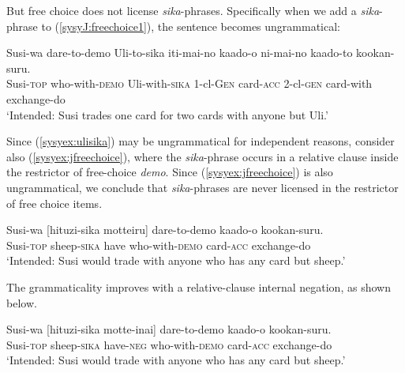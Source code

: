 \documentclass[output=paper,colorlinks,citecolor=brown,
]{langscibook}
\def\refp#1{(\ref{sy#1})}
\def\M#1{\textsc{#1}}
\begin{document}
But free choice does not license \emph{sika}-phrases. Specifically when we add a \emph{sika}-phrase to \refp{syJ:freechoice1}, the sentence becomes ungrammatical:

\ea \label{syex:ulisika}
\gll *Susi-wa dare-to-demo Uli-to-sika iti-mai-no kaado-o ni-mai-no kaado-to kookan-suru.\\
Susi-\M{top} who-with-\M{demo} Uli-with-\M{sika} 1-cl-\M{Gen} card-\M{acc} 2-cl-\M{gen} card-with exchange-do\\
\glt `Intended: Susi trades one card for two cards with anyone but Uli.'\z

Since \refp{syex:ulisika} may be ungrammatical for independent  reasons, consider also \refp{syex:jfreechoice}, where the \emph{sika}-phrase  occurs in a relative clause inside the restrictor of free-choice \emph{demo}.
Since \refp{syex:jfreechoice} is also ungrammatical, we conclude that \emph{sika}-phrases are never licensed in the restrictor of free choice items.


\ea \label{syex:jfreechoice}
\gll *Susi-wa [hituzi-sika motteiru] dare-to-demo kaado-o kookan-suru.\\
Susi-\M{top} sheep-\M{sika} have who-with-\M{demo} card-\M{acc} exchange-do\\
\glt `Intended: Susi would trade with anyone who has any card but sheep.'\z

The grammaticality improves with a relative-clause internal negation, as shown below.

\ea 
\gll Susi-wa [hituzi-sika motte-inai] dare-to-demo kaado-o kookan-suru.\\
Susi-\M{top} sheep-\M{sika} have-\M{neg} who-with-\M{demo} card-\M{acc} exchange-do\\
\glt `Intended: Susi would trade with anyone who has any card but sheep.'\z







\end{document}
